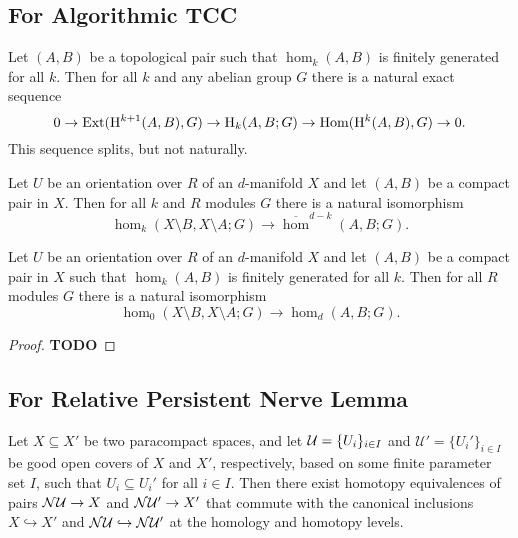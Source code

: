 \subsection{For Algorithmic TCC}

\begin{lemma}
  Let $(A,B)$ be a topological pair such that $\hom_k(A, B)$ is finitely generated for all $k$.
  Then for all $k$ and any abelian group $G$ there is a natural exact sequence
  \[ 0\to\mathrm{Ext}(\mathrm{H}^{k+1}(A, B), G)\to \mathrm{H}_k(A, B; G)\to \mathrm{Hom}(\mathrm{H}^k(A, B), G)\to 0.\]
  This sequence splits, but not naturally.
\end{lemma}

\begin{theorem}
  Let $U$ be an orientation over $R$ of an $d$-manifold $X$ and let $(A, B)$ be a compact pair in $X$.
  Then for all $k$ and $R$ modules $G$ there is a natural isomorphism
  \[ \hom_k(X\setminus B, X\setminus A; G)\to\overline{\hom}^{d-k}(A, B; G).\]
\end{theorem}

\begin{lemma}
  Let $U$ be an orientation over $R$ of an $d$-manifold $X$ and let $(A, B)$ be a compact pair in $X$ such that $\hom_k(A, B)$ is finitely generated for all $k$.
  Then for all $R$ modules $G$ there is a natural isomorphism
  \[ \hom_0(X\setminus B, X\setminus A; G)\to\hom_d(A, B; G). \]
\end{lemma}
\begin{proof}
  \textbf{TODO}
\end{proof}

\subsection{For Relative Persistent Nerve Lemma}

\begin{lemma}\label{lem:pers_nerve}
  Let $X\subseteq X'$ be two paracompact spaces, and let $\mathcal{U} = \{U_i\}_{i\in I}$ and $\mathcal{U}' = \{U_i'\}_{i\in I}$ be good open covers of $X$ and $X'$, respectively, based on some finite parameter set $I$, such that $U_i\subseteq U_i'$ for all $i\in I$.
  Then there exist homotopy equivalences of pairs $\mathcal{N}\mathcal{U}\to X$ and $\mathcal{N}\mathcal{U}'\to X'$ that commute with the canonical inclusions $X \hookrightarrow X'$ and $\mathcal{N}\mathcal{U}\hookrightarrow \mathcal{N}\mathcal{U}'$ at the homology and homotopy levels.
\end{lemma}

